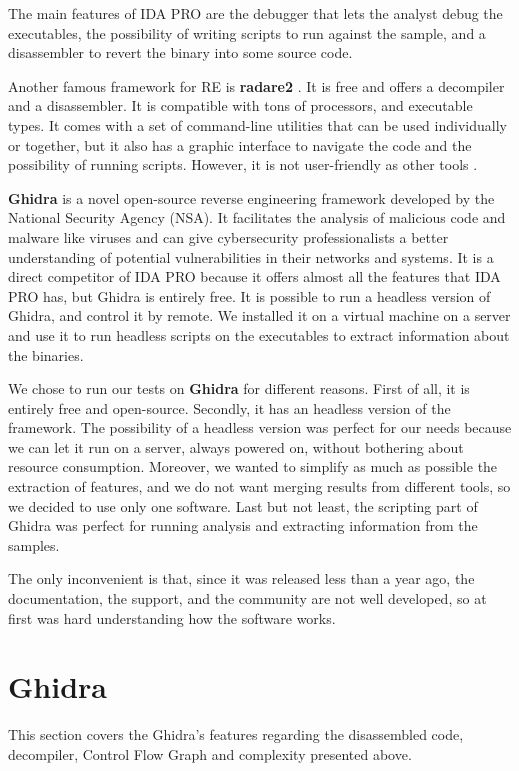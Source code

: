 The main features of IDA PRO \cite{ida} are the debugger that lets the analyst debug the executables, the possibility of writing scripts to run against the sample, and a disassembler to revert the binary into some source code. 


Another famous framework for RE is \textbf{radare2} \cite{radare2}. It is free and offers a decompiler and a disassembler.  It is compatible with tons of processors, and executable types. It comes with a set of command-line utilities that can be used individually or together, but it also has a graphic interface to navigate the code and the possibility of running scripts. However, it is not user-friendly as other tools .

\textbf{Ghidra} \cite{ghidra} is a novel open-source reverse engineering framework developed by the National Security Agency (NSA). It facilitates the analysis of malicious code and malware like viruses and can give cybersecurity professionalists a better understanding of potential vulnerabilities in their networks and systems. It is a direct competitor of IDA PRO because it offers almost all the features that IDA PRO has, but Ghidra is entirely free. It is possible to run a headless version of Ghidra, and control it by remote. We installed it on a virtual machine on a server and use it to run headless scripts on the executables to extract information about the binaries.

We chose to run our tests on \textbf{Ghidra} for different reasons. First of all, it is entirely free and open-source.
Secondly, it has an headless version of the framework. The possibility of a headless version was perfect for our needs because we can let it run on a server, always powered on, without bothering about resource consumption. 
Moreover, we wanted to simplify as much as possible the extraction of features, and we do not want merging results from different tools, so we decided to use only one software. 
Last but not least, the scripting part of Ghidra was perfect for running analysis and extracting information from the samples. 

The only inconvenient is that, since it was released less than a year ago, the documentation, the support, and the community are not well developed, so at first was hard understanding how the software works.
\section{Ghidra}

This section covers the Ghidra's features regarding the disassembled code, decompiler, Control Flow Graph and complexity presented above.
 
